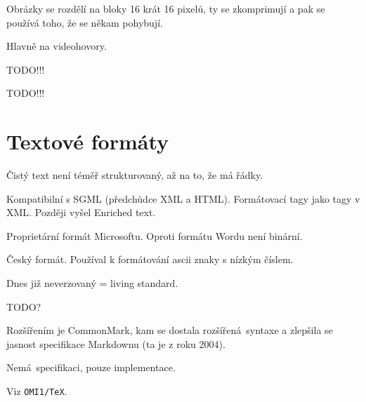 \documentclass[12pt]{article}					%
\begin{document}
\begin{definice}
	Obrázky se rozdělí na bloky 16 krát 16 pixelů, ty se zkomprimují a pak se používá toho, že se někam pohybují.
\end{definice}

\begin{definice}[H.261]
	Hlavně na videohovory.
\end{definice}

\begin{definice}
	TODO!!!
\end{definice}

TODO!!!


\section{Textové formáty}
\begin{definice}
	Čistý text není téměř strukturovaný, až na to, že má řádky.
\end{definice}

\begin{definice}[Richtext]
	Kompatibilní s SGML (předchůdce XML a HTML). Formátovací tagy jako tagy v XML. Později vyšel Enriched text.
\end{definice}

\begin{definice}
	Proprietární formát Microsoftu. Oproti formátu Wordu není binární.
\end{definice}

\begin{definice}[602]
	Český formát. Používal k formátování ascii znaky s nízkým číslem.
\end{definice}

\begin{definice}
	Dnes již neverzovaný = living standard.
\end{definice}

\begin{definice}[Markdown]
	TODO?

	Rozšířením je CommonMark, kam se dostala rozšířená syntaxe a zlepšila se jasnost specifikace Markdownu (ta je z roku 2004).
\end{definice}

\begin{definice}[Wikitext]
	Nemá specifikaci, pouze implementace.
\end{definice}

\begin{definice}[TeX]
	Viz \verb|OMI1/TeX|.
\end{definice}
\end{document}
